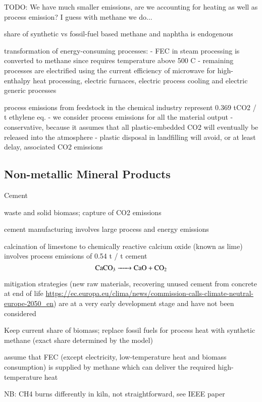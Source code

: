 TODO: We have much smaller emissions, are we accounting for heating as well as
process emission? I guess with methane we do...

share of synthetic vs fossil-fuel based methane and naphtha is endogenous

transformation of energy-consuming processes:
- FEC in steam processing is converted to methane since requires temperature above 500 \deg{} C 
- remaining processes are electrified using the current efficiency  of microwave for high-enthalpy heat processing,
  electric furnaces, electric process cooling and electric generic processes

process emissions from feedstock in the chemical industry represent 0.369 tCO2 / t ethylene eq.
- we consider process emissions for all the material output
- conservative, because it assumes that all plastic-embedded CO2 will eventually be released into the atmosphere
- plastic disposal in landfilling will avoid, or at least delay, associated CO2 emissions

\subsection{Non-metallic Mineral Products}

Cement

waste and solid biomass; capture of CO2 emissions

cement manufacturing involves large process and energy emissions

calcination of limestone to chemically reactive calcium oxide (known as lime)
involves process emissions of 0.54 t  / t cement
\begin{equation}
    \ce{CaCO3 -> CaO + CO2}
\end{equation}

mitigation strategies (new raw materials, recovering unused cement from concrete at end of life \url{https://ec.europa.eu/clima/news/commission-calls-climate-neutral-europe-2050_en})
are at a very early development stage and have not been considered

Keep current share of biomass; replace fossil fuels for process heat with
synthetic methane (exact share determined by the model)

assume that FEC (except electricity, low-temperature heat and biomass consumption)
is supplied by methane which can deliver the required high-temperature heat

NB: CH4 burns differently in kiln, not straightforward, see IEEE paper

